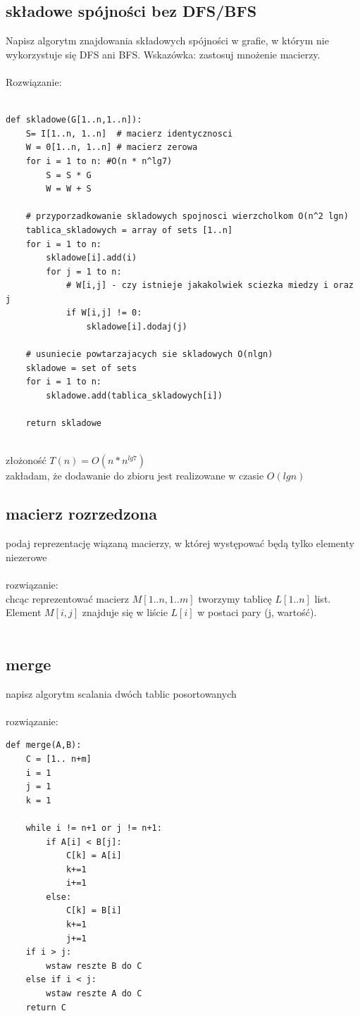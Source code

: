 \documentclass{article}
\begin{document}
\subsection*{składowe spójności bez DFS/BFS}
Napisz algorytm znajdowania składowych spójności w grafie,  w którym nie wykorzystuje się DFS ani BFS. Wskazówka: zastosuj mnożenie
macierzy. \\\\
Rozwiązanie:\\

\begin{lstlisting}

def skladowe(G[1..n,1..n]):
	S= I[1..n, 1..n]  # macierz identycznosci
	W = 0[1..n, 1..n] # macierz zerowa
	for i = 1 to n: #O(n * n^lg7)
		S = S * G
		W = W + S
	
	# przyporzadkowanie skladowych spojnosci wierzcholkom O(n^2 lgn)
	tablica_skladowych = array of sets [1..n]
	for i = 1 to n:
		skladowe[i].add(i)
		for j = 1 to n:
			# W[i,j] - czy istnieje jakakolwiek sciezka miedzy i oraz j
			if W[i,j] != 0: 
				skladowe[i].dodaj(j)
	
	# usuniecie powtarzajacych sie skladowych O(nlgn)
	skladowe = set of sets
	for i = 1 to n:
		skladowe.add(tablica_skladowych[i])
			
	return skladowe
	
\end{lstlisting}
złożoność $T(n) = O(n * n^{lg7})$ \\
zakładam, że dodawanie do zbioru jest realizowane w czasie $O(lgn)$


\subsection*{macierz rozrzedzona}
podaj reprezentację wiązaną macierzy, w której występować będą tylko elementy niezerowe \\\\
rozwiązanie: \\
chcąc reprezentować macierz $M[1..n, 1..m]$ tworzymy tablicę $L[1..n]$ list.  Element $M[i, j]$ znajduje się w liście $L[i]$ w postaci pary (j, wartość).\\\\

\subsection*{merge}
napisz algorytm scalania dwóch tablic posortowanych \\\\ rozwiązanie:
\begin{lstlisting}
def merge(A,B):
	C = [1.. n+m]
	i = 1 
	j = 1
	k = 1
	
	while i != n+1 or j != n+1:
		if A[i] < B[j]:
			C[k] = A[i]
			k+=1
			i+=1 
		else:
			C[k] = B[i]
			k+=1
			j+=1
	if i > j:
		wstaw reszte B do C
	else if i < j:
		wstaw reszte A do C
	return C
\end{lstlisting}
\end{document}
